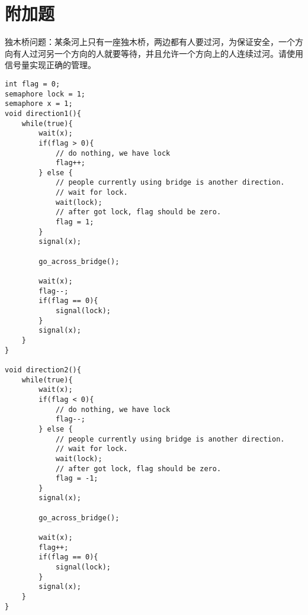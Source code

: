 \documentclass{ctexart}
\begin{document}
\section{附加题}
\begin{outline}[enumerate]
    \1 独木桥问题：某条河上只有一座独木桥，两边都有人要过河，为保证安全，一个方向有人过河另一个方向的人就要等待，并且允许一个方向上的人连续过河。请使用信号量实现正确的管理。
\begin{verbatim}
int flag = 0;
semaphore lock = 1;
semaphore x = 1;
void direction1(){
    while(true){
        wait(x);
        if(flag > 0){
            // do nothing, we have lock
            flag++;
        } else {
            // people currently using bridge is another direction.
            // wait for lock.
            wait(lock);
            // after got lock, flag should be zero.
            flag = 1;
        }
        signal(x);

        go_across_bridge();

        wait(x);
        flag--;
        if(flag == 0){
            signal(lock);
        }
        signal(x);
    }
}

void direction2(){
    while(true){
        wait(x);
        if(flag < 0){
            // do nothing, we have lock
            flag--;
        } else {
            // people currently using bridge is another direction.
            // wait for lock.
            wait(lock);
            // after got lock, flag should be zero.
            flag = -1;
        }
        signal(x);

        go_across_bridge();

        wait(x);
        flag++;
        if(flag == 0){
            signal(lock);
        }
        signal(x);
    }
}
\end{verbatim}
    
\end{outline}
\end{document}
